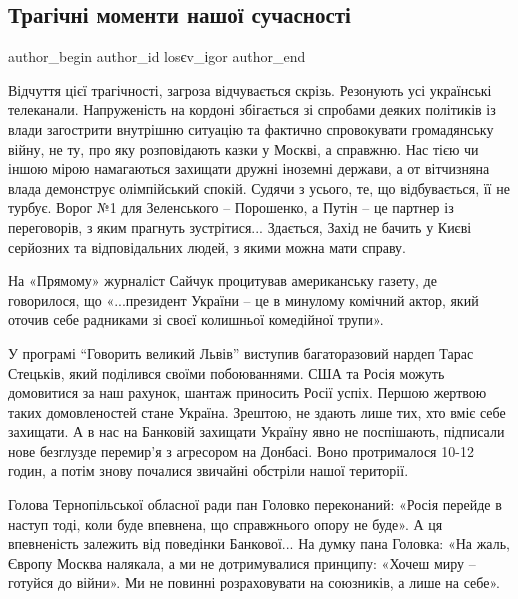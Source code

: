  
 
 
 
 
\subsection{Трагічні моменти нашої сучасності}
\label{sec:03_01_2022.stz.news.ua.den.1.tragichni_momenty_suchasnosti}

\ifcmt
 author_begin
   author_id losєv_іgor
 author_end
\fi

Відчуття цієї трагічності, загроза відчувається скрізь. Резонують усі
українські телеканали. Напруженість на кордоні збігається зі спробами деяких
політиків із влади загострити внутрішню ситуацію та фактично спровокувати
громадянську війну, не ту, про яку розповідають казки у Москві, а справжню. Нас
тією чи іншою мірою намагаються захищати дружні іноземні держави, а от
вітчизняна влада демонструє олімпійський спокій. Судячи з усього, те, що
відбувається, її не турбує. Ворог №1 для Зеленського – Порошенко, а Путін – це
партнер із переговорів, з яким прагнуть зустрітися... Здається, Захід не бачить у
Києві серйозних та відповідальних людей, з якими можна мати справу.

На «Прямому» журналіст Сайчук процитував американську газету, де говорилося, що
«...президент України – це в минулому комічний актор, який оточив себе радниками
зі своєї колишньої комедійної трупи».

У програмі \enquote{Говорить великий Львів} виступив багаторазовий нардеп Тарас
Стецьків, який поділився своїми побоюваннями. США та Росія можуть домовитися за
наш рахунок, шантаж приносить Росії успіх. Першою жертвою таких домовленостей
стане Україна. Зрештою, не здають лише тих, хто вміє себе захищати. А в нас на
Банковій захищати Україну явно не поспішають, підписали нове безглузде
перемир'я з агресором на Донбасі. Воно протрималося 10-12 годин, а потім знову
почалися звичайні обстріли нашої території.

Голова Тернопільської обласної ради пан Головко переконаний: «Росія перейде в
наступ тоді, коли буде впевнена, що справжнього опору не буде». А ця
впевненість залежить від поведінки Банкової... На думку пана Головка: «На жаль,
Європу Москва налякала, а ми не дотримувалися принципу: «Хочеш миру – готуйся
до війни». Ми не повинні розраховувати на союзників, а лише на себе».

